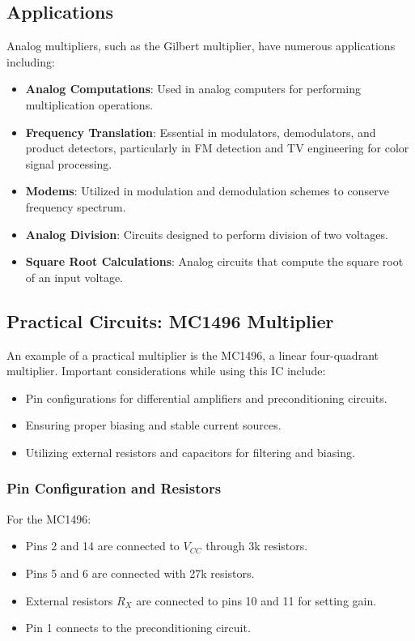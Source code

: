 \documentclass[a4paper,9pt,twoside,openany,twocolumn]{memoir}
\begin{document}
\subsection{Applications}
Analog multipliers, such as the Gilbert multiplier, have numerous applications including:
\begin{itemize}
    \item \textbf{Analog Computations}: Used in analog computers for performing multiplication operations.
    \item \textbf{Frequency Translation}: Essential in modulators, demodulators, and product detectors, particularly in FM detection and TV engineering for color signal processing.
    \item \textbf{Modems}: Utilized in modulation and demodulation schemes to conserve frequency spectrum.
    \item \textbf{Analog Division}: Circuits designed to perform division of two voltages.
    \item \textbf{Square Root Calculations}: Analog circuits that compute the square root of an input voltage.
\end{itemize}

\subsection{Practical Circuits: MC1496 Multiplier}
An example of a practical multiplier is the MC1496, a linear four-quadrant multiplier. Important considerations while using this IC include:
\begin{itemize}
    \item Pin configurations for differential amplifiers and preconditioning circuits.
    \item Ensuring proper biasing and stable current sources.
    \item Utilizing external resistors and capacitors for filtering and biasing.
\end{itemize}
\subsubsection{Pin Configuration and Resistors}
For the MC1496:
\begin{itemize}
    \item Pins 2 and 14 are connected to \( V_{CC} \) through 3k resistors.
    \item Pins 5 and 6 are connected with 27k resistors.
    \item External resistors \( R_X \) are connected to pins 10 and 11 for setting gain.
    \item Pin 1 connects to the preconditioning circuit.
\end{itemize}
\end{document}
